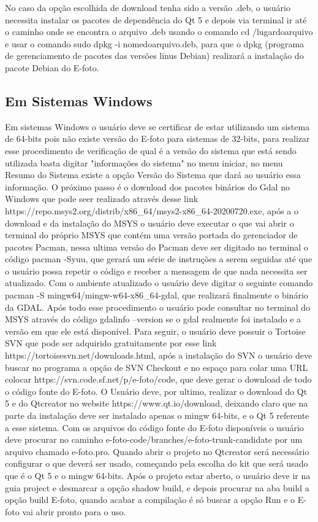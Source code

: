 No caso da opção escolhida de download tenha sido a versão .deb, o usuário necessita instalar os pacotes de dependência do Qt 5 e depois via terminal ir até o caminho onde se encontra o arquivo .deb usando o comando cd /lugardoarquivo e usar o comando sudo dpkg -i nomedoarquivo.deb, para que o dpkg (programa de gerenciamento de pacotes das versões linus Debian) realizará a instalação do pacote Debian do E-foto.

\subsection{Em Sistemas Windows}

Em sistemas Windows o usuário deve se certificar de estar utilizando um sistema de 64-bits pois não existe versão do E-foto para sistemas de 32-bits, para realizar esse procedimento de verificação de qual é a versão do sistema que está sendo utilizada basta digitar "informações do sistema" no menu iniciar, no menu Resumo do Sistema existe a opção Versão do Sistema que dará ao usuário essa informação. O próximo passo é o download dos pacotes binários do Gdal no Windows que pode seer realizado através desse link https://repo.msys2.org/distrib/x86_64/msys2-x86_64-20200720.exe, após a o download e da instalação do MSYS o usuário deve executar o que vai abrir o terminal do próprio MSYS que contém uma versão portada do gerenciador de pacotes Pacman, nessa ultima versão do Pacman deve ser digitado no terminal o código pacman -Syuu, que gerará um série de instruções a serem seguidas até que o usuário possa repetir o código e receber a mensagem de que nada necessita ser atualizado. Com o ambiente atualizado o usuário deve digitar o seguinte comando pacman -S mingw64/mingw-w64-x86_64-gdal, que realizará finalmente o binário da GDAL. Após todo esse procedimento o usuário pode consultar no terminal do MSYS através do código gdalinfo --version se o gdal realmente foi instalado e a versão em que ele está disponível. Para seguir, o usuário deve possuir o Tortoise SVN que pode ser adquirido gratuitamente por esse link https://tortoisesvn.net/downloads.html, após a instalação do SVN o usuário deve buscar no programa a opção de SVN Checkout e no espaço para colar uma URL colocar https://svn.code.sf.net/p/e-foto/code, que deve gerar o download de todo o código fonte do E-foto. O Usuário deve, por ultimo, realizar o download do Qt 5 e do Qtcreator no website https://www.qt.io/download, deixando claro que na parte da instalação deve ser instalado apenas o mingw 64-bits, e o Qt 5 referente a esse sistema. Com os arquivos do código fonte do E-foto disponíveis o usuário deve procurar no caminho e-foto-code/branches/e-foto-trunk-candidate por um arquivo chamado e-foto.pro. Quando abrir o projeto no Qtcreator será necessário configurar o que deverá ser usado, começando pela escolha do kit que será usado que é o Qt 5 e o mingw 64-bits. Após o projeto estar aberto, o usuário deve ir na guia project e desmarcar a opção shadow build, e depois procurar na aba build a opção build E-foto, quando acabar a compilação é só buscar a opção Run e o E-foto vai abrir pronto para o uso.